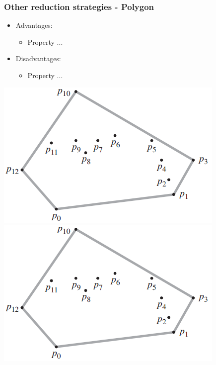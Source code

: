 \begin{frame}
\frametitle{Other reduction strategies - Polygon}
\begin{multicols}{2}
	\begin{itemize}
		\item Advantages:
		\begin{itemize}
			\item Property ...
		\end{itemize}
		\item Disadvantages:
		\begin{itemize}
			\item Property ...
		\end{itemize}
	\end{itemize}
\columnbreak
	\begin{center}
		\includegraphics[scale=0.5]{graphics/convexHull-example}\\
		\includegraphics[scale=0.5]{graphics/convexHull-example}
	\end{center}
\end{multicols}
\end{frame}	